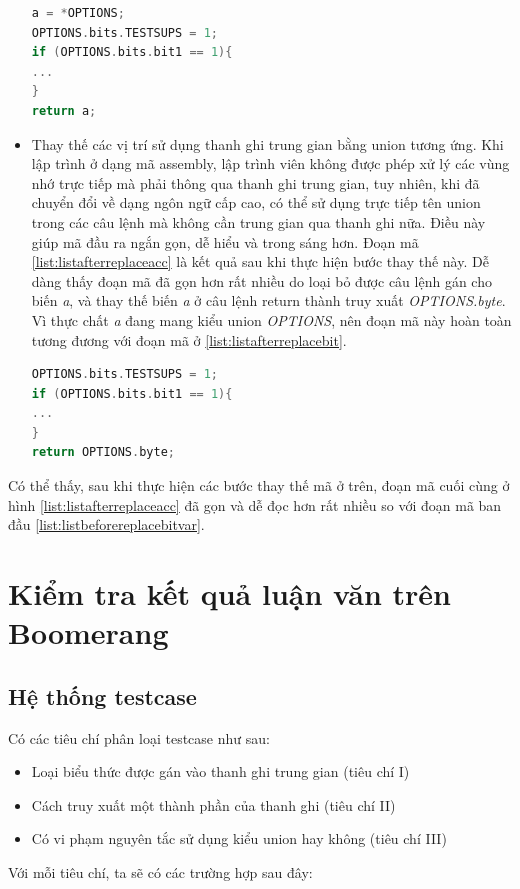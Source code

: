 \begin{itemize}
\begin{lstlisting}[caption={Mã đầu ra sau khi thực hiện bước thay thế truy xuất trực tiếp đến một phần của thanh ghi trung gian},label={list:listafterreplacebit}, language = c]
a = *OPTIONS;
OPTIONS.bits.TESTSUPS = 1;
if (OPTIONS.bits.bit1 == 1){
...
}
return a;
\end{lstlisting}
\item Thay thế các vị trí sử dụng thanh ghi trung gian bằng union tương ứng. Khi lập trình ở dạng mã assembly, lập trình viên không được phép xử lý các vùng nhớ trực tiếp mà phải thông qua thanh ghi trung gian, tuy nhiên, khi đã chuyển đổi về dạng ngôn ngữ cấp cao, có thể sử dụng trực tiếp tên union trong các câu lệnh mà không cần trung gian qua thanh ghi nữa. Điều này giúp mã đầu ra ngắn gọn, dễ hiểu và trong sáng hơn. Đoạn mã \ref{list:listafterreplaceacc} là kết quả sau khi thực hiện bước thay thế này. Dễ dàng thấy đoạn mã đã gọn hơn rất nhiều do loại bỏ được câu lệnh gán cho biến \textit{a}, và thay thế biến \textit{a} ở câu lệnh return thành truy xuất \textit{OPTIONS.byte}. Vì thực chất \textit{a} đang mang kiểu union \textit{OPTIONS}, nên đoạn mã này hoàn toàn tương đương với đoạn mã ở \ref{list:listafterreplacebit}.

\begin{lstlisting}[caption={Mã đầu ra sau khi thực hiện bước thay thế thanh ghi trung gian},label={list:listafterreplaceacc}, language = c]
OPTIONS.bits.TESTSUPS = 1;
if (OPTIONS.bits.bit1 == 1){
...
}
return OPTIONS.byte;
\end{lstlisting}
\end{itemize}

Có thể thấy, sau khi thực hiện các bước thay thế mã ở trên, đoạn mã cuối cùng ở hình \ref{list:listafterreplaceacc} đã gọn và dễ đọc hơn rất nhiều so với đoạn mã ban đầu \ref{list:listbeforereplacebitvar}.
\section{Kiểm tra kết quả luận văn trên Boomerang}

\subsection{Hệ thống testcase}
Có các tiêu chí phân loại testcase như sau:
\begin{itemize}
	\item Loại biểu thức được gán vào thanh ghi trung gian (tiêu chí I)
	\item Cách truy xuất một thành phần của thanh ghi (tiêu chí II)
	\item Có vi phạm nguyên tắc sử dụng kiểu union hay không (tiêu chí III)
\end{itemize}
Với mỗi tiêu chí, ta sẽ có các trường hợp sau đây:

